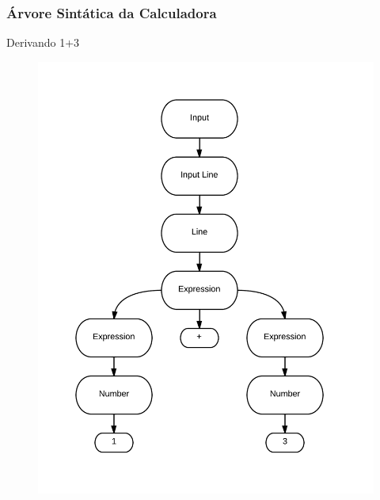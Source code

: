 \documentclass{beamer}
\begin{document}
\begin {frame}
\frametitle{Árvore Sintática da Calculadora }
Derivando 1+3

\begin{figure} 	%
            \centering		%
            \includegraphics[scale=0.12]{2.png} %
            \end{figure} 

\end{frame}
\end{document}
